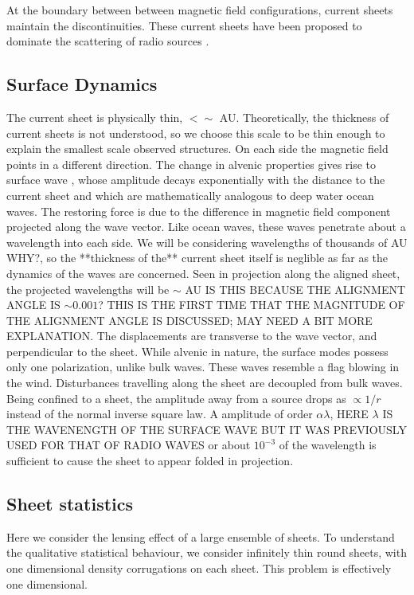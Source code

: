 \documentclass[useAMS,usenatbib]{mn2e}
\begin{document}
At the boundary between between magnetic field configurations, current
sheets maintain the discontinuities.  These current sheets have been
proposed to dominate the scattering of radio
sources \citep{2006ApJ...640L.159G}.

\subsection{Surface Dynamics}

The current sheet is physically thin, $< \sim $ AU.  Theoretically,
the thickness of current sheets is not understood, so we choose this
scale to be thin enough to explain the smallest scale observed
structures.  On each side the
magnetic field points in a different direction.  The change in alvenic
properties gives rise to surface
wave \citep{1991SoPh..133..263J, 2009GApFD.103...89J}, whose amplitude
decays exponentially with the distance to the current sheet and which are
mathematically analogous to deep water ocean waves.  The restoring force is due to the
difference in magnetic field component projected along the wave
vector.  Like ocean waves, these waves penetrate about a wavelength
into each side.  We will be considering wavelengths of thousands of
AU WHY?, so the **thickness of the** current sheet itself is neglible as far as the dynamics of
the waves are concerned.  Seen in projection along the aligned sheet,
the projected wavelengths will be $\sim $ AU IS THIS BECAUSE THE ALIGNMENT ANGLE IS
$\sim 0.001$?  THIS IS THE FIRST TIME THAT THE MAGNITUDE OF THE ALIGNMENT ANGLE
IS DISCUSSED; MAY NEED A BIT MORE EXPLANATION.  The displacements are
transverse to the wave vector, and perpendicular to the sheet.  While
alvenic in nature, the surface modes possess only one polarization,
unlike bulk waves.  These waves resemble a flag blowing in the wind.
Disturbances travelling along the sheet are decoupled from bulk waves.
Being confined to a sheet, the amplitude away from a source drops as
$\propto 1/r$ instead of the normal inverse square law.  A amplitude
of order $\alpha \lambda$, HERE $\lambda$ IS THE WAVENENGTH OF THE SURFACE WAVE BUT
IT WAS PREVIOUSLY USED FOR THAT OF RADIO WAVES or about $10^{-3}$ of the wavelength is
sufficient to cause the sheet to appear folded in projection.

\subsection{Sheet statistics}

Here we consider the lensing effect of a large ensemble of sheets.  To
understand the qualitative statistical behaviour, we consider
infinitely thin round sheets, with one dimensional density
corrugations on each sheet.  This problem is effectively one dimensional.
\end{document}
